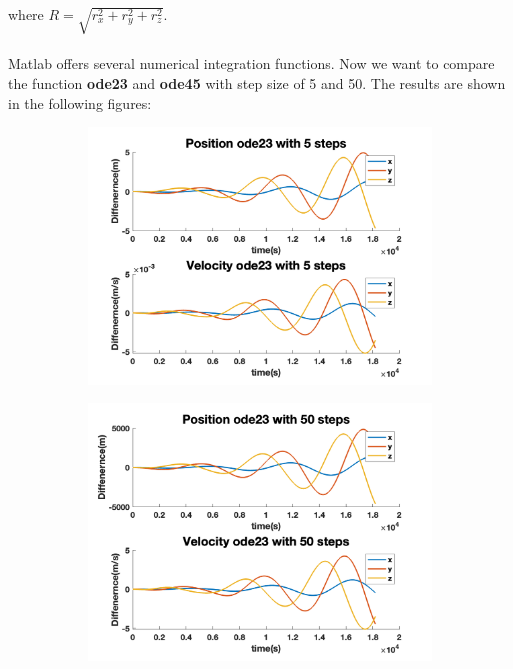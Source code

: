 \documentclass[12pt
,headinclude
,headsepline
,bibtotocnumbered
]{scrartcl}
\begin{document}
where $R=\sqrt{r_x^2+r_y^2+r_z^2}$.
\\\\
Matlab offers several numerical integration functions. Now we want to compare the function \textbf{ode23} and \textbf{ode45} with step size of 5 and 50. The results are shown in the following figures:
\begin{figure}[H]
\centering
\begin{subfigure}[b]{0.45\textwidth}
\includegraphics[width=1\textwidth]{./plots/ode23_5_yprime.png}
\end{subfigure}
\begin{subfigure}[b]{0.45\textwidth}
\includegraphics[width=1\textwidth]{./plots/ode23_50_yprime.png}
\end{subfigure}

\end{figure}
\end{document}
